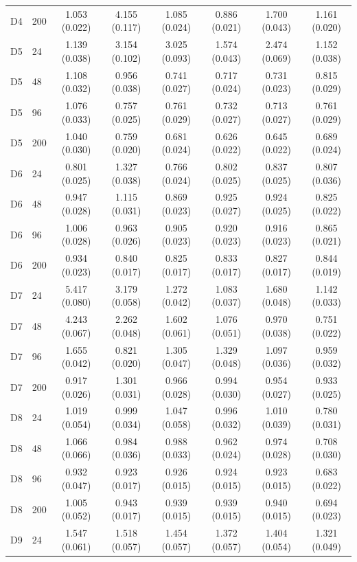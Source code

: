 \begin{table}[!htbp]
\begin{threeparttable}
\begin{tabular}{llcccccc}
D4 & 200 & 1.053 (0.022) & 4.155 (0.117) & 1.085 (0.024) & 0.886 (0.021) & 1.700 (0.043) & 1.161 (0.020) \\
D5 & 24 & 1.139 (0.038) & 3.154 (0.102) & 3.025 (0.093) & 1.574 (0.043) & 2.474 (0.069) & 1.152 (0.038) \\
D5 & 48 & 1.108 (0.032) & 0.956 (0.038) & 0.741 (0.027) & 0.717 (0.024) & 0.731 (0.023) & 0.815 (0.029) \\
D5 & 96 & 1.076 (0.033) & 0.757 (0.025) & 0.761 (0.029) & 0.732 (0.027) & 0.713 (0.027) & 0.761 (0.029) \\
D5 & 200 & 1.040 (0.030) & 0.759 (0.020) & 0.681 (0.024) & 0.626 (0.022) & 0.645 (0.022) & 0.689 (0.024) \\
D6 & 24 & 0.801 (0.025) & 1.327 (0.038) & 0.766 (0.024) & 0.802 (0.025) & 0.837 (0.025) & 0.807 (0.036) \\
D6 & 48 & 0.947 (0.028) & 1.115 (0.031) & 0.869 (0.023) & 0.925 (0.027) & 0.924 (0.025) & 0.825 (0.022) \\
D6 & 96 & 1.006 (0.028) & 0.963 (0.026) & 0.905 (0.023) & 0.920 (0.023) & 0.916 (0.023) & 0.865 (0.021) \\
D6 & 200 & 0.934 (0.023) & 0.840 (0.017) & 0.825 (0.017) & 0.833 (0.017) & 0.827 (0.017) & 0.844 (0.019) \\
D7 & 24 & 5.417 (0.080) & 3.179 (0.058) & 1.272 (0.042) & 1.083 (0.037) & 1.680 (0.048) & 1.142 (0.033) \\
D7 & 48 & 4.243 (0.067) & 2.262 (0.048) & 1.602 (0.061) & 1.076 (0.051) & 0.970 (0.038) & 0.751 (0.022) \\
D7 & 96 & 1.655 (0.042) & 0.821 (0.020) & 1.305 (0.047) & 1.329 (0.048) & 1.097 (0.036) & 0.959 (0.032) \\
D7 & 200 & 0.917 (0.026) & 1.301 (0.031) & 0.966 (0.028) & 0.994 (0.030) & 0.954 (0.027) & 0.933 (0.025) \\
D8 & 24 & 1.019 (0.054) & 0.999 (0.034) & 1.047 (0.058) & 0.996 (0.032) & 1.010 (0.039) & 0.780 (0.031) \\
D8 & 48 & 1.066 (0.066) & 0.984 (0.036) & 0.988 (0.033) & 0.962 (0.024) & 0.974 (0.028) & 0.708 (0.030) \\
D8 & 96 & 0.932 (0.047) & 0.923 (0.017) & 0.926 (0.015) & 0.924 (0.015) & 0.923 (0.015) & 0.683 (0.022) \\
D8 & 200 & 1.005 (0.052) & 0.943 (0.017) & 0.939 (0.015) & 0.939 (0.015) & 0.940 (0.015) & 0.694 (0.023) \\
D9 & 24 & 1.547 (0.061) & 1.518 (0.057) & 1.454 (0.057) & 1.372 (0.057) & 1.404 (0.054) & 1.321 (0.049) \\

\end{tabular}
\end{threeparttable}
\end{table}
